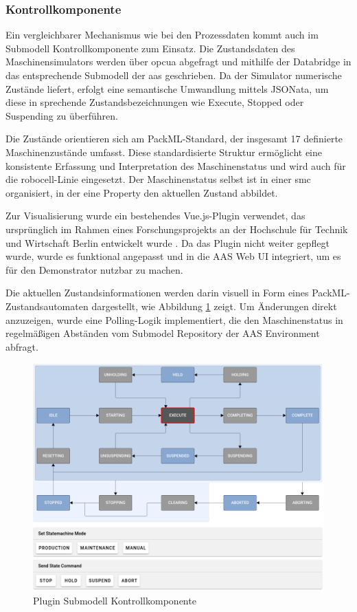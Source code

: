 \subsubsection*{Kontrollkomponente}
\vspace{-0.5em}
Ein vergleichbarer Mechanismus wie bei den Prozessdaten kommt auch im Submodell Kontrollkomponente zum Einsatz. 
Die Zustandsdaten des Maschinensimulators werden über \acs{opcua} abgefragt und mithilfe der Databridge in das entsprechende Submodell der \acs{aas} geschrieben. 
Da der Simulator numerische Zustände liefert, erfolgt eine semantische Umwandlung mittels JSONata, um diese in sprechende Zustandsbezeichnungen wie Execute, Stopped oder Suspending zu überführen.

Die Zustände orientieren sich am PackML-Standard, der insgesamt 17 definierte Maschinenzustände umfasst. 
Diese standardisierte Struktur ermöglicht eine konsistente Erfassung und Interpretation des Maschinenstatus und wird auch für die robocell-Linie eingesetzt.
Der Maschinenstatus selbst ist in einer \acs{smc} organisiert, in der eine Property den aktuellen Zustand abbildet.

Zur Visualisierung wurde ein bestehendes Vue.js-Plugin verwendet, das ursprünglich im Rahmen eines Forschungsprojekts an der Hochschule für Technik und Wirtschaft Berlin entwickelt wurde \cite{HTW1}\cite{HTW2}. 
Da das Plugin nicht weiter gepflegt wurde, wurde es funktional angepasst und in die AAS Web UI integriert, um es für den Demonstrator nutzbar zu machen.

Die aktuellen Zustandsinformationen werden darin visuell in Form eines PackML-Zu\-standsautomaten dargestellt, wie Abbildung \ref{fig:PackMLZustandsautomat} zeigt. 
Um Änderungen direkt anzuzeigen, wurde eine Polling-Logik implementiert, die den Maschinenstatus in regelmäßigen Abständen vom Submodel Repository der AAS Environment abfragt.

\begin{figure}[htbp] 
    \centering 
        \includegraphics[width=1\textwidth]{Bilder/Ergebnisse/DynamischeDaten/Kontrollkomponente/PackMl.PNG} 
    \caption{Plugin Submodell Kontrollkomponente} 
    \label{fig:PackMLZustandsautomat} 
\end{figure}

